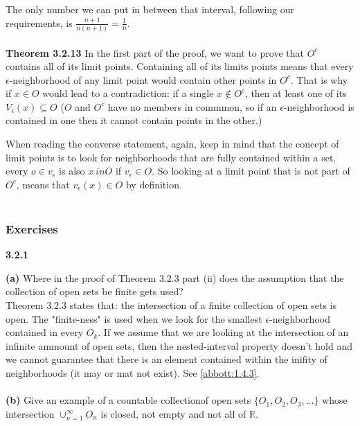 The only number we can put in between that interval, following our requirements, is $\frac{n+1}{n(n+1)} = \frac{1}{n}$.
\\~\\


\textbf{Theorem 3.2.13}
In the first part of the proof, we want to prove that $O^c$ contains all of its limit points.
Containing all of its limits points means that every $\epsilon$-neighborhood of any limit point would
contain other points in $O^c$.
That is why if $x\in O$ would lead to a contradiction: if a single $x \notin O^c$, then at least one of its
$V_\epsilon (x) \subseteq O$ ($O$ and $O^c$ have no members in commmon, so if an $\epsilon$-neighborhood is contained
in one then it cannot contain points in the other.)

When reading the converse statement, again, keep in mind that the concept of limit points is to look for
neighborhoods that are fully contained within a set, every $o \in v_\epsilon $ is also $x \ in O$ if
$v_\epsilon \in O$.
So looking at a limit point that is not part of $O^c$, means that $v_{\epsilon} (x) \in O$ by definition.
\\~\\


\subsubsection{Exercises}

\textbf{3.2.1}

\textbf{(a)} Where in the proof of Theorem 3.2.3 part (ii) does the assumption that the collection of
open sets be finite gets used?
\\

Theorem 3.2.3 states that: the intersection of a finite collection of open sets is open.
The "finite-ness" is used when we look for the smallest $\epsilon$-neighborhood contained in every $O_k$.
If we assume that we are looking at the intersection of an infinite ammount of open sets, then the nested-interval
property doesn't hold and we cannot guarantee that there is an element contained within the inifity of neighborhoods (it may or mat not exist).
See \ref{abbott:1.4.3}.
\\~\\

\textbf{(b)} Give an example of a countable collectionof open sets $\{O_1, O_2, O_3, \ldots\}$
whose intersection $\cup^{\infty}_{n=1} O_n$ is closed, not empty and not all of $\mathbb{R}$.
\\~\\


